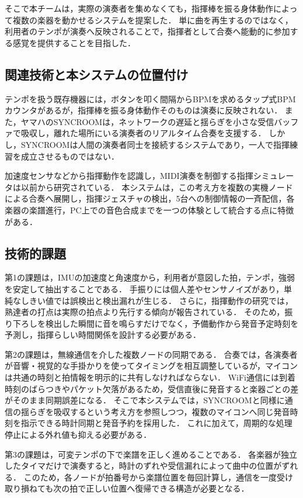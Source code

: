 \documentclass[uplatex,dvipdfmx]{jlreq}
\begin{document}
そこで本チームは，実際の演奏者を集めなくても，指揮棒を振る身体動作によって複数の楽器を動かせるシステムを提案した．
単に曲を再生するのではなく，利用者のテンポが演奏へ反映されることで，指揮者として合奏へ能動的に参加する感覚を提供することを目指した．

\subsection{関連技術と本システムの位置付け}
テンポを扱う既存機器には，ボタンを叩く間隔からBPMを求めるタップ式BPMカウンタがあるが，指揮棒を振る身体動作そのものは演奏に反映されない．
また，ヤマハのSYNCROOMは，ネットワークの遅延と揺らぎを小さな受信バッファで吸収し，離れた場所にいる演奏者のリアルタイム合奏を支援する\cite{syncroom}．
しかし，SYNCROOMは人間の演奏者同士を接続するシステムであり，一人で指揮練習を成立させるものではない．

加速度センサなどから指揮動作を認識し，MIDI演奏を制御する指揮シミュレータは以前から研究されている\cite{usa1998}．
本システムは，この考え方を複数の実機ノードによる合奏へ展開し，指揮ジェスチャの検出，5台への制御情報の一斉配信，各楽器の楽譜進行，PC上での音色合成までを一つの体験として統合する点に特徴がある．

\subsection{技術的課題}
第1の課題は，IMUの加速度と角速度から，利用者が意図した拍，テンポ，強弱を安定して抽出することである．
手振りには個人差やセンサノイズがあり，単純なしきい値では誤検出と検出漏れが生じる．
さらに，指揮動作の研究では，熟達者の打点は実際の拍点より先行する傾向が報告されている\cite{shinzano2004}．
そのため，振り下ろしを検出した瞬間に音を鳴らすだけでなく，予備動作から発音予定時刻を予測し，指揮らしい時間関係を設計する必要がある．

第2の課題は，無線通信を介した複数ノードの同期である．
合奏では，各演奏者が音響・視覚的な手掛かりを使ってタイミングを相互調整している\cite{kawase2014}が，マイコンは共通の時刻と拍情報を明示的に共有しなければならない．
WiFi通信には到着時刻のばらつきやパケット欠落があるため，受信直後に発音すると楽器ごとの差がそのまま同期誤差になる．
そこで本システムでは，SYNCROOMと同様に通信の揺らぎを吸収するという考え方を参照しつつ，複数のマイコンへ同じ発音時刻を指示できる時計同期と発音予約を採用した．
これに加えて，周期的な処理停止による外れ値も抑える必要がある．

第3の課題は，可変テンポの下で楽譜を正しく進めることである．
各楽器が独立したタイマだけで演奏すると，時計のずれや受信漏れによって曲中の位置がずれる．
このため，各ノードが拍番号から楽譜位置を毎回計算し，通信を一度受け取り損ねても次の拍で正しい位置へ復帰できる構造が必要となる．
\end{document}

